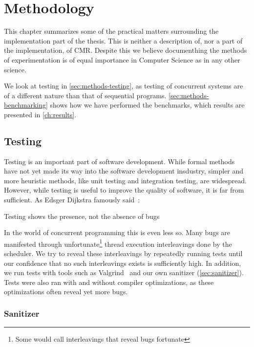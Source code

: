 \chapter{Methodology\label{ch:methodology}}

This chapter summarizes some of the practical matters surrounding the implementation part of the
thesis. This is neither a description of, nor a part of the implementation, of CMR\@. Despite this
we believe documenthing the methods of experimentation is of equal importance in Computer Science
as in any other science.

We look at testing in \cref{sec:methods-testing}, as testing of concurrent systems are of a
different nature than that of sequential programs.  \cref{sec:methods-benchmarking} shows how we
have performed the benchmarks, which results are presented in \cref{ch:results}.


\clearpage

\section{Testing\label{sec:methods-testing}}

Testing is an important part of software development. While formal methods have not yet made its
way into the software development insdustry, simpler and more heuristic methods, like unit testing
and integration testing, are widespread. However, while testing is useful to improve the quality of
software, it is far from sufficient. As Edsger Dijkstra famously said~\cite{buxton1970software}:
\begin{displayquote}
Testing shows the presence, not the absence of bugs
\end{displayquote}

In the world of concurrent programming this is even less so. Many bugs are manifested through
unfortunate\footnote{Some would call interleavings that reveal bugs fortunate} thread execution
interleavings done by the scheduler. We try to reveal these interleavings by repeatedly running
tests until our confidence that no such interleavings exists is sufficiently high. In addition, we
run tests with tools such as Valgrind~\cite{valgrind} and our own sanitizer (\cref{sec:sanitizer}).
Tests were also ran with and without compiler optimizations, as these optimizations often reveal
yet more bugs.


\subsection{Sanitizer\label{sec:sanitizer}}


